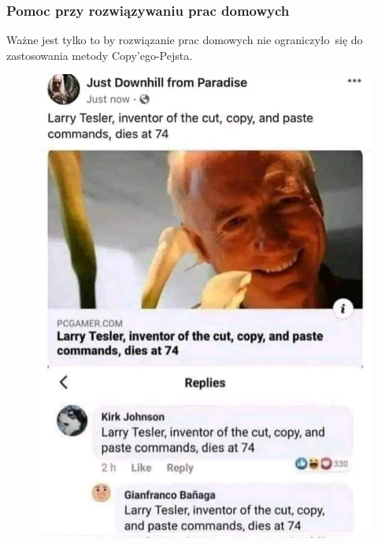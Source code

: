 \documentclass[10pt,t]{beamer}
\begin{document}
\begin{frame}
  \frametitle{Pomoc przy rozwiązywaniu prac domowych}



  Ważne jest tylko to by rozwiązanie prac domowych nie ograniczyło~się
  do zastosowania metody Copy’ego-Pejsta.

  \vspace{-0.5em}





  \begin{figure}

    \label{fig:The-best-salute}

    \centering


    \includegraphics[scale=0.19]
    {./Presentations-pictures/The-best-salute.jpg}


\end{figure}
\end{frame}
\end{document}
